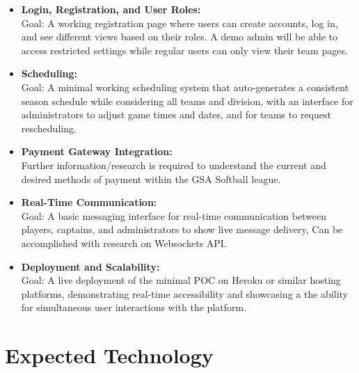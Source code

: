 \documentclass{article}
\begin{document}
\begin{itemize}
	\item \textbf{Login, Registration, and User Roles:} \\ Goal: A working registration page where users can create accounts, log in, and see different views based on their roles. A demo admin will be able to access restricted settings while regular users can only view their team pages. 
	\item \textbf{Scheduling:} \\ Goal: A minimal working scheduling system that auto-generates a consistent season schedule while considering all teams and division, with an interface for administrators to adjust game times and dates, and for teams to request rescheduling. 
  \item \textbf{Payment Gateway Integration:} \\ Further information/research is required to understand the current and desired methods of payment within the GSA Softball league. 
  \item \textbf{Real-Time Communication:} \\ Goal: A basic messaging interface for real-time communication between players, captains, and administrators to show live message delivery, Can be accomplished with research on Websockets API.
  \item \textbf{Deployment and Scalability:} \\ Goal: A live deployment of the minimal POC on Heroku or similar hosting platforms, demonstrating real-time accessibility and showcasing a the ability for simultaneous user interactions with the platform.
\end{itemize}


\section{Expected Technology}


\end{document}
